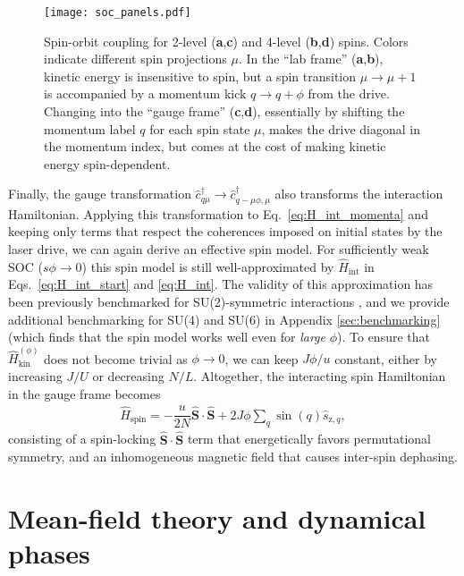 \documentclass[aps,pra,nofootinbib,twocolumn,superscriptaddress]{revtex4-2}
\renewcommand{\t}{\text} %
\newcommand{\f}[2]{\dfrac{#1}{#2}} %
\newcommand{\p}[1]{\left(#1\right)} %
\renewcommand{\v}{\bm} %
\newcommand{\1}{\mathds{1}}
\renewcommand{\c}{\hat c}
\newcommand{\s}{\hat s}
\renewcommand{\H}{\hat H}
\renewcommand{\S}{\hat S}
\newcommand{\z}{\text{z}}
\newcommand{\spin}{\text{spin}}
\begin{document}
\begin{figure}
\centering
\texttt{[image: soc\_panels.pdf]}
\caption{
Spin-orbit coupling for 2-level ({\bf a},{\bf c}) and 4-level ({\bf b},{\bf d}) spins.
Colors indicate different spin projections $\mu$.
In the ``lab frame'' ({\bf a},{\bf b}), kinetic energy is insensitive to spin, but a spin transition $\mu\to\mu+1$ is accompanied by a momentum kick $q\to q+\phi$ from the drive.
Changing into the ``gauge frame'' ({\bf c},{\bf d}), essentially by shifting the momentum label $q$ for each spin state $\mu$, makes the drive diagonal in the momentum index, but comes at the cost of making kinetic energy spin-dependent.
}
\label{fig:soc_panels}
\end{figure}

Finally, the gauge transformation $\c_{q\mu}^\dag\to \c_{q-\mu\phi,\mu}^\dag$ also transforms the interaction Hamiltonian.
Applying this transformation to Eq.~\eqref{eq:H_int_momenta} and keeping only terms that respect the coherences imposed on initial states by the laser drive, we can again derive an effective spin model.
For sufficiently weak SOC ($s\phi\to0$) this spin model is still well-approximated by $\H_{\t{int}}$ in Eqs.~\eqref{eq:H_int_start} and \eqref{eq:H_int}.
The validity of this approximation has been previously benchmarked for SU(2)-symmetric interactions \cite{he2019engineering, smale2019observation}, and we provide additional benchmarking for SU(4) and SU(6) in Appendix \ref{sec:benchmarking} (which finds that the spin model works well even for {\it large} $\phi$).
To ensure that $\H_{\t{kin}}^{(\phi)}$ does not become trivial as $\phi\to0$, we can keep $J\phi/u$ constant, either by increasing $J/U$ or decreasing $N/L$.
Altogether, the interacting spin Hamiltonian in the gauge frame becomes
\begin{align}
  \H_\spin = -\f{u}{2N} \v\S\cdot\v\S + 2J\phi \sum_q \sin\p{q} \s_{\z,q},
  \label{eq:H_spin}
\end{align}
consisting of a spin-locking $\v\S\cdot\v\S$ term that energetically favors permutational symmetry, and an inhomogeneous magnetic field that causes inter-spin dephasing.

\section{Mean-field theory and dynamical phases}
\label{sec:mean_field}
\end{document}
